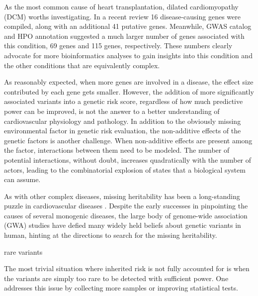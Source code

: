 \documentclass[letter]{bioinfo}
\begin{document}
As the most common cause of heart transplantation, dilated cardiomyopathy (DCM) worths investigating. In a recent review \citep{Burke:2016:Clinical} 16 disease-causing genes were compiled, along with an additional 41 putative genes. Meanwhile, GWAS catalog and HPO annotation suggested a much larger number of genes associated with this condition, 69 genes and 115 genes, respectively. These numbers clearly advocate for more bioinformatics analyses to gain insights into this condition and the other conditions that are equivalently complex.

As reasonably expected, when more genes are involved in a disease, the effect size contributed by each gene gets smaller. However, the addition of more significantly associated variants into a genetic risk score, regardless of how much predictive power can be improved, is not the answer to a better understanding of cardiovascular physiology and pathology. In addition to the obviously missing environmental factor in genetic risk evaluation, the non-additive effects of the genetic factors is another challenge. When non-additive effects are present among the factor, interactions between them need to be modeled. The number of potential interactions, without doubt, increases quadratically with the number of actors, leading to the combinatorial explosion of states that a biological system can assume.


As with other complex diseases, missing heritability has been a long-standing puzzle in cardiovascular diseases \citep{Manolio:2009:Finding}. Despite the early successes in pinpointing the causes of several monogenic diseases, the large body of genome-wide association (GWA) studies have defied many widely held beliefs about genetic variants in human, hinting at the directions to search for the missing heritability.




rare variants

The most trivial situation where inherited risk is not fully accounted for is when the variants are simply too rare to be detected with sufficient power. One addresses this issue by collecting more samples or improving statistical tests.
\end{document}
